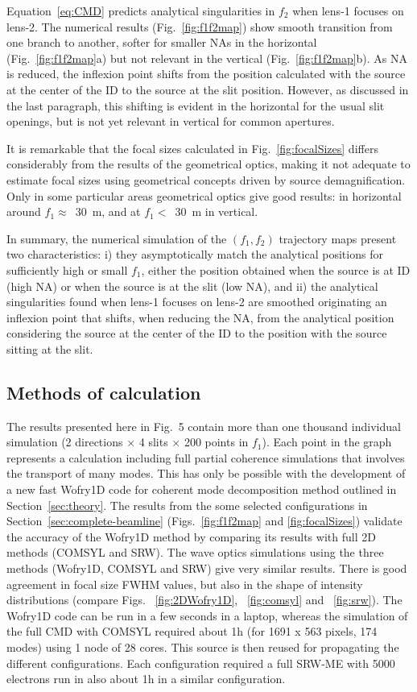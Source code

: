 \documentclass{iucr}              %
\begin{document}
Equation~\ref{eq:CMD} predicts analytical singularities in $f_2$ when lens-1 focuses on lens-2. The numerical results (Fig.~\ref{fig:f1f2map}) show smooth transition from one branch to another, softer for smaller NAs in the horizontal (Fig.~\ref{fig:f1f2map}a) but not relevant in the vertical (Fig.~\ref{fig:f1f2map}b). As NA is reduced, the inflexion point shifts from the position calculated with the source at the center of the ID to the source at the slit position. However, as discussed in the last paragraph, this shifting is evident in the horizontal for the usual slit openings, but is not yet relevant in vertical for common apertures. 

It is remarkable that the focal sizes calculated in Fig.~\ref{fig:focalSizes} differs considerably from the results of the geometrical optics, making it not adequate to estimate focal sizes using geometrical concepts driven by source demagnification. Only in some particular areas geometrical optics give good results: in horizontal around $f_1\approx$~\SI{30}{\meter}, and at  $f_1 <$~\SI{30}{\meter} in vertical. 

In summary, the numerical simulation of the $(f_1,f_2)$ trajectory maps present two characteristics: i) they asymptotically match the analytical positions for sufficiently high or small $f_1$, either the position obtained when the source is at ID (high NA) or when the source is at the slit (low NA), and ii) the analytical singularities found when lens-1 focuses on lens-2 are smoothed originating an inflexion point that shifts, when reducing the NA, from the analytical position considering the source at the center of the ID to the position with the source sitting at the slit.   
 

\subsection{Methods of calculation}

The results presented here in Fig.~5 contain more than one thousand individual simulation (2 directions $\times$ 4 slits $\times$ 200 points in $f_1$). Each point in the graph represents a calculation including full partial coherence simulations that involves the transport of many modes. This has only be possible with the development of a new fast Wofry1D code for coherent mode decomposition method outlined in Section~\ref{sec:theory}. The results from the some selected configurations in Section~\ref{sec:complete-beamline} (Figs.~\ref{fig:f1f2map} and \ref{fig:focalSizes}) validate the accuracy of the Wofry1D method by comparing its results with full 2D methods (COMSYL and SRW). The wave optics simulations using the three methods (Wofry1D, COMSYL and SRW) give very similar results. 
There is good agreement in focal size FWHM values, but also in the shape of intensity distributions (compare Figs. ~\ref{fig:2DWofry1D}, ~\ref{fig:comsyl} and ~\ref{fig:srw}). The Wofry1D code can be run in a few seconds in a laptop, whereas the simulation of the full CMD with COMSYL required about 1h (for 1691 x 563 pixels, 174 modes) using 1 node of 28 cores. This source is then reused for propagating the different configurations. Each configuration required a full SRW-ME with 5000 electrons run in also about 1h in a similar configuration. 
\end{document}
